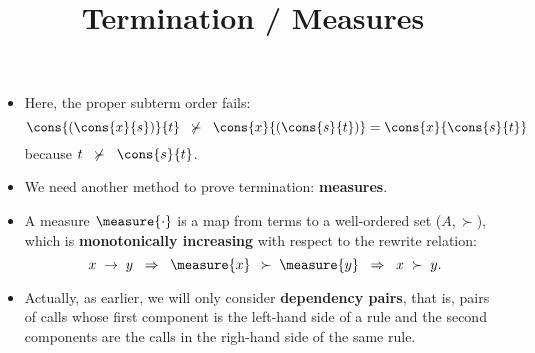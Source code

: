 \documentclass[wide]{slides}
\begin{document}
\begin{slide}
  \title{Termination / Measures}

  \begin{itemize}

    \item Here, the proper subterm order fails:
      \begin{equation*}
        \cons{(\cons{x}{s})}{t} \;\; \nsucc \;\;
        \cons{x}{(\cons{s}{t})} = \cons{x}{\cons{s}{t}}
      \end{equation*}
      because \(t \;\; \nsucc \;\; \cons{s}{t}\).

    \item We need another method to prove termination:
      \textbf{measures}.

    \item A measure \(\measure{\cdot}\) is a map from terms to a
      well\hyp{}ordered set (\(A,\succ\)), which is
      \textbf{monotonically increasing} with respect to the rewrite
      relation:
      \begin{equation*}
        x \; \rightarrow \; y \;\; \Rightarrow \;\; \measure{x} \;\,
        \succ \; \measure{y} \;\; \Rightarrow \;\; x\; \succ\; y.
      \end{equation*}

    \item Actually, as earlier, we will only consider
      \textbf{dependency pairs}, that is, pairs of calls whose first
      component is the left\hyp{}hand side of a rule and the second
      components are the calls in the righ\hyp{}hand side of the same
      rule.

  \end{itemize}


\end{slide}
\end{document}
